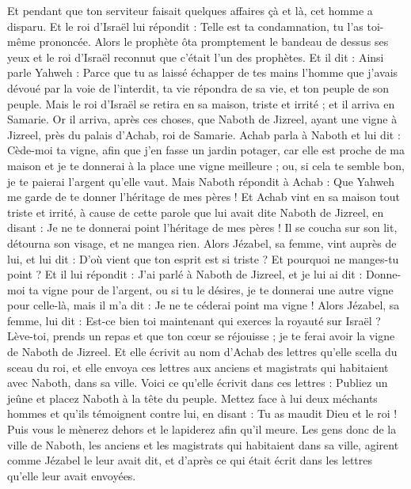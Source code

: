 \begin{multicols}{2}
Et pendant que ton serviteur faisait quelques affaires çà et là, cet homme a disparu. Et le roi d'Israël lui répondit : Telle est ta condamnation, tu l'as toi-même prononcée.
Alors le prophète ôta promptement le bandeau de dessus ses yeux et le roi d'Israël reconnut que c'était l'un des prophètes.
Et il dit : Ainsi parle Yahweh : Parce que tu as laissé échapper de tes mains l'homme que j'avais dévoué par la voie de l'interdit, ta vie répondra de sa vie, et ton peuple de son peuple.
Mais le roi d'Israël se retira en sa maison, triste et irrité ; et il arriva en Samarie.
\VerseOne{}Or il arriva, après ces choses, que Naboth de Jizreel, ayant une vigne à Jizreel, près du palais d'Achab, roi de Samarie.
Achab parla à Naboth et lui dit : Cède-moi ta vigne, afin que j'en fasse un jardin potager, car elle est proche de ma maison et je te donnerai à la place une vigne meilleure ; ou, si cela te semble bon, je te paierai l'argent qu'elle vaut.
Mais Naboth répondit à Achab : Que Yahweh me garde de te donner l'héritage de mes pères !
Et Achab vint en sa maison tout triste et irrité, à cause de cette parole que lui avait dite Naboth de Jizreel, en disant : Je ne te donnerai point l'héritage de mes pères ! Il se coucha sur son lit, détourna son visage, et ne mangea rien.
Alors Jézabel, sa femme, vint auprès de lui, et lui dit : D'où vient que ton esprit est si triste ? Et pourquoi ne manges-tu point ?
Et il lui répondit : J'ai parlé à Naboth de Jizreel, et je lui ai dit : Donne-moi ta vigne pour de l'argent, ou si tu le désires, je te donnerai une autre vigne pour celle-là, mais il m'a dit : Je ne te céderai point ma vigne !
Alors Jézabel, sa femme, lui dit : Est-ce bien toi maintenant qui exerces la royauté sur Israël ? Lève-toi, prends un repas et que ton cœur se réjouisse ; je te ferai avoir la vigne de Naboth de Jizreel.
Et elle écrivit au nom d'Achab des lettres qu'elle scella du sceau du roi, et elle envoya ces lettres aux anciens et magistrats qui habitaient avec Naboth, dans sa ville.
Voici ce qu'elle écrivit dans ces lettres : Publiez un jeûne et placez Naboth à la tête du peuple.
Mettez face à lui deux méchants hommes et qu'ils témoignent contre lui, en disant : Tu as maudit Dieu et le roi ! Puis vous le mènerez dehors et le lapiderez afin qu'il meure.
Les gens donc de la ville de Naboth, les anciens et les magistrats qui habitaient dans sa ville, agirent comme Jézabel le leur avait dit, et d'après ce qui était écrit dans les lettres qu'elle leur avait envoyées.

\end{multicols}
